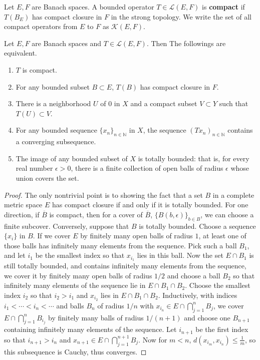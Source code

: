 \begin{defn} Let $E,F$ are Banach spaces. A bounded operator $T\in \mathcal{L}(E,F)$ is \textbf{compact} if $T(B_E)$ has compact closure in $F$ in the strong topology. We write the set of all compact operators from $E$ to $F$ as $\mathcal{K}(E,F)$.
\end{defn}

\begin{prop} Let $E,F$ are Banach spaces and $T\in \mathcal{L}
(E,F)$. Then The followings are equivalent.
\begin{enumerate}
    \item $T$ is compact.
    \item For any bounded subset $B\subset E$, $T(B)$ has compact closure in $F$.
    \item There is a neighborhood $U$ of $0$ in $X$ and a compact subset $V\subset Y$ such that $T(U)\subset V$.
    \item For any bounded sequence $\{x_n\}_{n\in \mathbb{N}}$ in $X$, the sequence $(Tx_n)_{n\in \mathbb{N}}$ contains a converging subsequence.
    \item The image of any bounded subset of $X$ is totally bounded: that is, for every real number $\epsilon>0$, there is a finite collection of open balls of radius $\epsilon$ whose union covers the set.
\end{enumerate}
\end{prop}
\begin{proof}
The only nontrivial point is to showing the fact that a set $B$ in a complete metric space $E$ has compact closure if and only if it is totally bounded. For one direction, if $\overline{B}$ is compact, then for a cover of $\overline{B}$, $\{B(b,\epsilon)\}_{b\in B}$, we can choose a finite subcover. Conversely, suppose that $B$ is totally bounded. Choose a sequence $\{x_i\}$ in $B$. If we cover $E$ by finitely many open balls of radius $1$, at least one of those balls has infinitely many elements from the sequence. Pick such a ball $B_1$, and let $i_1$ be the smallest index so that $x_{i_1}$ lies in this ball. Now the set $E\cap B_1$ is still totally bounded, and contains infinitely many elements from the sequence, we cover it by finitely many open balls of radius $1/2$ and choose a ball $B_2$ so that infinitely many elements of the sequence lie in $E\cap B_1\cap B_2$. Choose the smallest index $i_2$ so that $i_2>i_1$ and $x_{i_2}$ lies in $E\cap B_1\cap B_2$. Inductively, with indices $i_1<\cdots<i_n<\cdots$ and balls $B_n$ of radius $1/n$ with $x_{i_n}\in E\cap \bigcap_{j=1}^{n} B_{j}$, we cover $E\cap \bigcap_{j=1}^{n} B_{i_j}$ by finitely many balls of radius $1/(n+1)$ and choose one $B_{n+1}$ containing infinitely many elements of the sequence. Let $i_{n+1}$ be the first index so that $i_{n+1}>i_n$ and $x_{n+1}\in E\cap \bigcap_{j=1}^{n+1}B_{j}$. Now for $m<n$, $d(x_{i_m},x_{i_n})\leq \frac{1}{m}$, so this subsequence is Cauchy, thus converges.
\end{proof}

